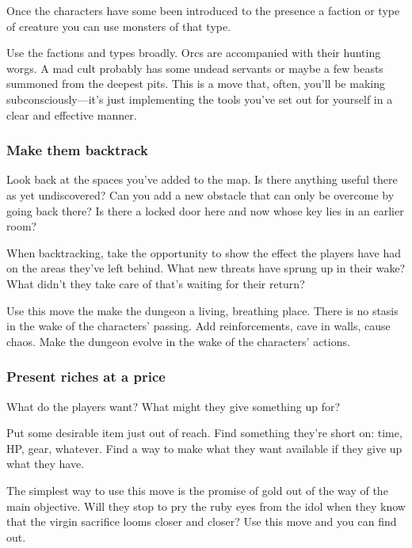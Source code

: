 Once the characters have some been introduced to the presence a faction or type of creature you can use monsters of that type.

 

Use the factions and types broadly. Orcs are accompanied with their hunting worgs. A mad cult probably has some undead servants or maybe a few beasts summoned from the deepest pits. This is a move that, often, you'll be making subconsciously—it's just implementing the tools you've set out for yourself in a clear and effective manner.

 
\subsubsection{Make them backtrack}   
 

Look back at the spaces you've added to the map. Is there anything useful there as yet undiscovered? Can you add a new obstacle that can only be overcome by going back there? Is there a locked door here and now whose key lies in an earlier room?

 

When backtracking, take the opportunity to show the effect the players have had on the areas they've left behind. What new threats have sprung up in their wake? What didn't they take care of that's waiting for their return?

 

Use this move the make the dungeon a living, breathing place. There is no stasis in the wake of the characters' passing. Add reinforcements, cave in walls, cause chaos. Make the dungeon evolve in the wake of the characters' actions.

 
\subsubsection{Present riches at a price}     
 

What do the players want? What might they give something up for?

 

Put some desirable item just out of reach. Find something they're short on: time, HP, gear, whatever. Find a way to make what they want available if they give up what they have.

 

The simplest way to use this move is the promise of gold out of the way of the main objective. Will they stop to pry the ruby eyes from the idol when they know that the virgin sacrifice looms closer and closer? Use this move and you can find out.

